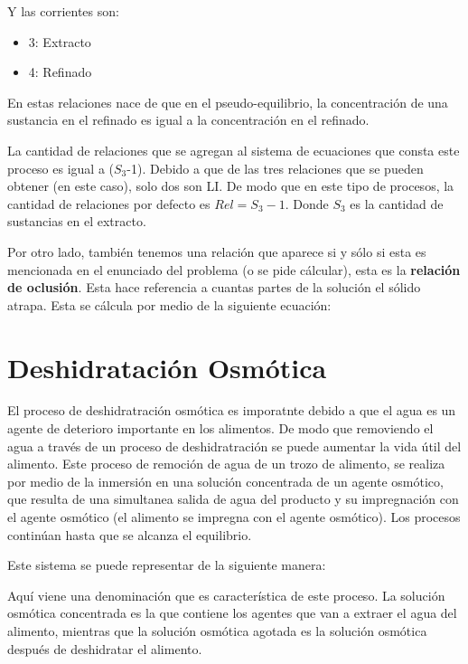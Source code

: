 Y las corrientes son:
\begin{itemize}
    \item 3: Extracto
    \item 4: Refinado
\end{itemize}

En estas relaciones nace de que en el pseudo-equilibrio, la concentración de una sustancia en el refinado es igual a la concentración en el refinado. 

La cantidad de relaciones que se agregan al sistema de ecuaciones que consta este proceso es igual a ($S_3$-1). Debido a que de las tres relaciones que se pueden obtener (en este caso), solo dos son LI.
De modo que en este tipo de procesos, la cantidad de relaciones por defecto es $Rel=S_3-1$. Donde $S_3$ es la cantidad de sustancias en el extracto.

Por otro lado, también tenemos una relación que aparece si y sólo si esta es mencionada en el enunciado del problema (o se pide cálcular), esta es la \textbf{relación de oclusión}. Esta hace referencia a cuantas partes de la solución el sólido atrapa. Esta se cálcula por medio de la siguiente ecuación:


\clearpage
\section{Deshidratación Osmótica}

El proceso de deshidratración osmótica es imporatnte debido a que el agua es un agente de deterioro importante en los alimentos. De modo que removiendo el agua a través de un proceso de deshidratración se puede aumentar la vida útil del alimento.
Este proceso de remoción de agua de un trozo de alimento, se realiza por medio de la inmersión en una solución concentrada de un agente osmótico, que resulta de una simultanea salida de agua del producto y su impregnación con el agente osmótico (el alimento se impregna con el agente osmótico).
Los procesos continúan hasta que se alcanza el equilibrio.

Este sistema se puede representar de la siguiente manera:

Aquí viene una denominación que es característica de este proceso. La solución osmótica concentrada es la que contiene los agentes que van a extraer el agua del alimento, mientras que la solución osmótica agotada es la solución osmótica después de deshidratar el alimento.


